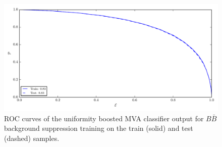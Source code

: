 \begin{figure}[H]
\centering
\captionsetup{width=0.8\linewidth}
\includegraphics[width=\linewidth]{fig/addendums/uMVA1dc_roc}
\caption{ROC curves of the uniformity boosted MVA classifier output for $B\bar B$ background suppression training on the train (solid) and test (dashed) samples.}
\end{figure}